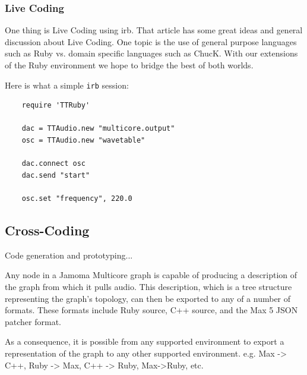 \documentclass[twoside,a4paper]{article}
\begin{document}
\subsubsection{Live Coding} %

One thing is Live Coding \cite{Collins:2003} using irb.  That article has some great ideas and general discussion about Live Coding.  One topic is the use of general purpose languages such as Ruby vs. domain specific languages such as ChucK.  With our extensions of the Ruby environment we hope to bridge the best of both worlds.


Here is what a simple \texttt{irb} session:

\begin{lstlisting}
	require 'TTRuby'
	
 	dac = TTAudio.new "multicore.output"
 	osc = TTAudio.new "wavetable"

	dac.connect osc
	dac.send "start"
	
	osc.set "frequency", 220.0
\end{lstlisting}




\subsection{Cross-Coding} %


Code generation and prototyping...

Any node in a Jamoma Multicore graph is capable of producing a description of the graph from which it pulls audio.  This description, which is a tree structure representing the graph's topology, can then be exported to any of a number of formats.  These formats include Ruby source, C++ source, and the Max 5 JSON patcher format.

As a consequence, it is possible from any supported environment to export a representation of the graph to any other supported environment.  e.g. Max -> C++, Ruby -> Max, C++ -> Ruby, Max->Ruby, etc.





\end{document}
